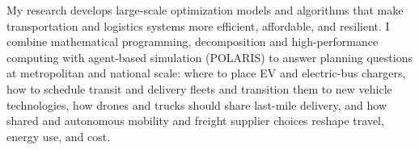 \vspace{2pt}
{\setlength{\parindent}{0pt}%
My research develops large-scale optimization models and algorithms that make transportation and
logistics systems more efficient, affordable, and resilient. I combine mathematical programming,
decomposition and high-performance computing with agent-based simulation (POLARIS) to answer
planning questions at metropolitan and national scale: where to place EV and electric-bus chargers,
how to schedule transit and delivery fleets and transition them to new vehicle technologies, how
drones and trucks should share last-mile delivery, and how shared and autonomous mobility and
freight supplier choices reshape travel, energy use, and cost.\par}
